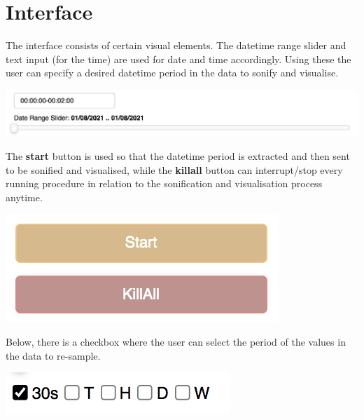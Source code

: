 \documentclass[11pt]{article}
\begin{document}
\section{Interface}
\label{sec:orgacf52b9}
The interface consists of certain visual elements.
The datetime range slider and text input (for the time) are used for date and time accordingly. Using these the user can specify a desired datetime period in the data to sonify and visualise.

\begin{center}
\includegraphics[width=.9\linewidth]{./datetime_selection.png}
\end{center}

The \textbf{start} button is used so that the datetime period is extracted and then sent to be sonified and visualised, while the \textbf{killall} button can interrupt/stop every running procedure in relation to the sonification and visualisation process anytime.

\begin{center}
\includegraphics[width=.9\linewidth]{./start_kill_buttons.png}
\end{center}

Below, there is a checkbox where the user can select the period of the values in the data to re-sample.

\begin{center}
\includegraphics[width=.9\linewidth]{./resample_checkbox.png}
\end{center}
\end{document}

